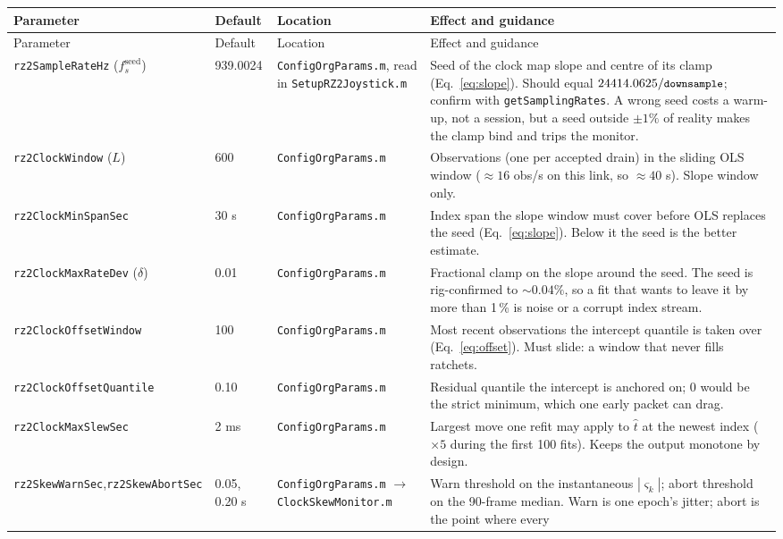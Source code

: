 \documentclass[11pt,a4paper]{article}
\newcommand{\code}[1]{\texttt{\small #1}}
\newcommand{\file}[1]{\texttt{\small #1}}
\begin{document}
\begin{longtable}{@{}P{4.0cm}P{1.65cm}P{3.55cm}P{5.75cm}@{}}
\toprule
Parameter & Default & Location & Effect and guidance \\
\midrule
\endfirsthead
\toprule
Parameter & Default & Location & Effect and guidance \\
\midrule
\endhead
\code{rz2SampleRateHz} ($f_s^{\text{seed}}$) & 939.0024 &
  \file{ConfigOrgParams.m}, read in \file{SetupRZ2Joystick.m} &
  Seed of the clock map slope and centre of its clamp (Eq.~\eqref{eq:slope}).
  Should equal $24414.0625/\code{downsample}$; confirm with
  \code{getSamplingRates}. A wrong seed costs a warm-up, not a session, but a
  seed outside $\pm 1\%$ of reality makes the clamp bind and trips the
  monitor. \\
\code{rz2ClockWindow} ($L$) & 600 & \file{ConfigOrgParams.m} &
  Observations (one per accepted drain) in the sliding OLS window
  ($\approx 16$ obs/s on this link, so $\approx 40$ s). Slope window only. \\
\code{rz2ClockMinSpanSec} & 30 s & \file{ConfigOrgParams.m} &
  Index span the slope window must cover before OLS replaces the seed
  (Eq.~\eqref{eq:slope}). Below it the seed is the better estimate. \\
\code{rz2ClockMaxRateDev} ($\delta$) & 0.01 & \file{ConfigOrgParams.m} &
  Fractional clamp on the slope around the seed. The seed is rig-confirmed to
  $\sim 0.04\%$, so a fit that wants to leave it by more than 1\,\% is noise or
  a corrupt index stream. \\
\code{rz2ClockOffset\-Window} & 100 & \file{ConfigOrgParams.m} &
  Most recent observations the intercept quantile is taken over
  (Eq.~\eqref{eq:offset}). Must slide: a window that never fills ratchets. \\
\code{rz2ClockOffset\-Quantile} & 0.10 & \file{ConfigOrgParams.m} &
  Residual quantile the intercept is anchored on; 0 would be the strict
  minimum, which one early packet can drag. \\
\code{rz2ClockMaxSlewSec} & 2 ms & \file{ConfigOrgParams.m} &
  Largest move one refit may apply to $\hat t$ at the newest index
  ($\times 5$ during the first 100 fits). Keeps the output monotone by design. \\
\code{rz2SkewWarnSec},\newline\code{rz2SkewAbortSec} & 0.05, 0.20 s &
  \file{ConfigOrgParams.m} $\rightarrow$ \file{ClockSkewMonitor.m} &
  Warn threshold on the instantaneous $|\varsigma_k|$; abort threshold on the
  90-frame median. Warn is one epoch's jitter; abort is the point where every

\end{longtable}
\end{document}
